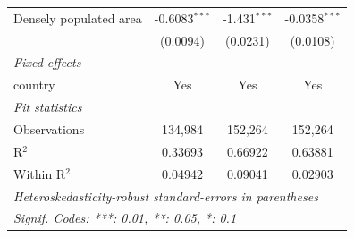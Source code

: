 \begin{tabular}{lccc}
   Densely populated area & -0.6083$^{***}$ & -1.431$^{***}$  & -0.0358$^{***}$\\   
                          & (0.0094)        & (0.0231)        & (0.0108)\\   
   \midrule
   \emph{Fixed-effects}\\
   country                & Yes             & Yes             & Yes\\  
   \midrule
   \emph{Fit statistics}\\
   Observations           & 134,984         & 152,264         & 152,264\\  
   R$^2$                  & 0.33693         & 0.66922         & 0.63881\\  
   Within R$^2$           & 0.04942         & 0.09041         & 0.02903\\  
   \midrule \midrule
   \multicolumn{4}{l}{\emph{Heteroskedasticity-robust standard-errors in parentheses}}\\
   \multicolumn{4}{l}{\emph{Signif. Codes: ***: 0.01, **: 0.05, *: 0.1}}\\
\end{tabular}
\par\endgroup


